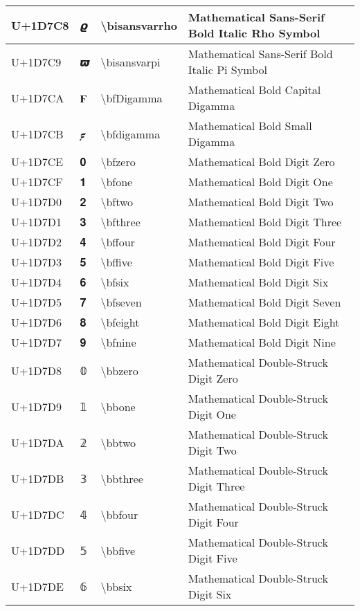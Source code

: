 \begin{table}[h]
\begin{tabulary}{\linewidth}{|L|L|L|L|}
\hline
U+1D7C8 & 𝟈 & {\textbackslash}bisansvarrho & Mathematical Sans-Serif Bold Italic Rho Symbol \\
\hline
U+1D7C9 & 𝟉 & {\textbackslash}bisansvarpi & Mathematical Sans-Serif Bold Italic Pi Symbol \\
\hline
U+1D7CA & 𝟊 & {\textbackslash}bfDigamma & Mathematical Bold Capital Digamma \\
\hline
U+1D7CB & 𝟋 & {\textbackslash}bfdigamma & Mathematical Bold Small Digamma \\
\hline
U+1D7CE & 𝟎 & {\textbackslash}bfzero & Mathematical Bold Digit Zero \\
\hline
U+1D7CF & 𝟏 & {\textbackslash}bfone & Mathematical Bold Digit One \\
\hline
U+1D7D0 & 𝟐 & {\textbackslash}bftwo & Mathematical Bold Digit Two \\
\hline
U+1D7D1 & 𝟑 & {\textbackslash}bfthree & Mathematical Bold Digit Three \\
\hline
U+1D7D2 & 𝟒 & {\textbackslash}bffour & Mathematical Bold Digit Four \\
\hline
U+1D7D3 & 𝟓 & {\textbackslash}bffive & Mathematical Bold Digit Five \\
\hline
U+1D7D4 & 𝟔 & {\textbackslash}bfsix & Mathematical Bold Digit Six \\
\hline
U+1D7D5 & 𝟕 & {\textbackslash}bfseven & Mathematical Bold Digit Seven \\
\hline
U+1D7D6 & 𝟖 & {\textbackslash}bfeight & Mathematical Bold Digit Eight \\
\hline
U+1D7D7 & 𝟗 & {\textbackslash}bfnine & Mathematical Bold Digit Nine \\
\hline
U+1D7D8 & 𝟘 & {\textbackslash}bbzero & Mathematical Double-Struck Digit Zero \\
\hline
U+1D7D9 & 𝟙 & {\textbackslash}bbone & Mathematical Double-Struck Digit One \\
\hline
U+1D7DA & 𝟚 & {\textbackslash}bbtwo & Mathematical Double-Struck Digit Two \\
\hline
U+1D7DB & 𝟛 & {\textbackslash}bbthree & Mathematical Double-Struck Digit Three \\
\hline
U+1D7DC & 𝟜 & {\textbackslash}bbfour & Mathematical Double-Struck Digit Four \\
\hline
U+1D7DD & 𝟝 & {\textbackslash}bbfive & Mathematical Double-Struck Digit Five \\
\hline
U+1D7DE & 𝟞 & {\textbackslash}bbsix & Mathematical Double-Struck Digit Six \\
\hline

\end{tabulary}
\end{table}
